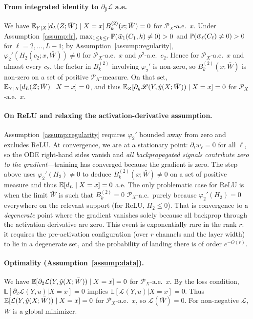 \documentclass[nohyperref]{article}
\theoremstyle{plain}
\theoremstyle{definition}
\theoremstyle{remark}
\begin{document}
\paragraph{From integrated identity to $\partial_{\hat{y}}\mathscr{L}$ a.e.}
We have $\mathbb{E}_{Y|X}[d_L(Z;\bar W)\mid X=x]\,B_k^{(2)}(x;\bar W)=0$ for $\mathcal{P}_X$-a.e.\ $x$. Under Assumption~\ref{assump:lr}, $\max_{1\le k\le r}\mathbb{P}(\bar{w}_1(C_1,k)\ne 0)>0$ and $\mathbb{P}(\bar{w}_\ell(C_\ell)\ne 0)>0$ for $\ell=2,\ldots,L-1$; by Assumption~\ref{assump:regularity}, $\varphi_2'(H_2(c_2;x,\bar W))\ne 0$ for $\mathcal{P}_X$-a.e.\ $x$ and $\rho^2$-a.e.\ $c_2$. Hence for $\mathcal{P}_X$-a.e.\ $x$ and almost every $c_2$, the factor in $B_k^{(2)}$ involving $\varphi_2'$ is non-zero, so $B_k^{(2)}(x;\bar W)$ is non-zero on a set of positive $\mathcal{P}_X$-measure. On that set, $\mathbb{E}_{Y|X}[d_L(Z;\bar W)\mid X=x]=0$, and thus $\mathbb{E}_Z[\partial_{\hat{y}}\mathscr{L}(Y,\hat{y}(X;\bar W))\mid X=x]=0$ for $\mathcal{P}_X$-a.e.\ $x$.

\paragraph{On ReLU and relaxing the activation-derivative assumption.}
\label{app:relu-activation-remark}
Assumption~\ref{assump:regularity} requires $\varphi_2'$ bounded away from zero and excludes ReLU. At convergence, we are at a stationary point: $\partial_t w_\ell=0$ for all $\ell$, so the ODE right-hand sides vanish and \emph{all backpropagated signals contribute zero to the gradient}---training has converged because the gradient is zero. The step above uses $\varphi_2'(H_2)\ne 0$ to deduce $B_k^{(2)}(x;\bar W)\ne 0$ on a set of positive measure and thus $\mathbb{E}[d_L\mid X=x]=0$ a.e. The only problematic case for ReLU is when the limit $\bar W$ is such that $B_k^{(2)}=0$ $\mathcal{P}_X$-a.e.\ purely because $\varphi_2'(H_2)=0$ everywhere on the relevant support (for ReLU, $H_2\le 0$). That is convergence to a \emph{degenerate} point where the gradient vanishes solely because all backprop through the activation derivative are zero. This event is exponentially rare in the rank $r$: it requires the pre-activation configuration (over $r$ channels and the layer width) to lie in a degenerate set, and the probability of landing there is of order $e^{-O(r)}$.

\paragraph{Optimality (Assumption~\ref{assump:data}).}
We have $\mathbb{E}[\partial_2\mathcal{L}(Y,\hat{y}(X;\bar W))\mid X=x]=0$ for $\mathcal{P}_X$-a.e.\ $x$. By the loss condition, $\mathbb{E}[\partial_2\mathcal{L}(Y,u)|X=x]=0$ implies $\mathbb{E}[\mathcal{L}(Y,u)|X=x]=0$. Thus $\mathbb{E}[\mathcal{L}(Y,\hat{y}(X;\bar W))\mid X=x]=0$ for $\mathcal{P}_X$-a.e.\ $x$, so $\mathscr{L}(\bar W)=0$. For non-negative $\mathcal{L}$, $\bar W$ is a global minimizer.
\end{document}
